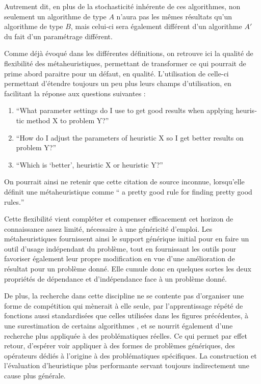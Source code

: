Autrement dit, en plus de la stochasticité inhérente de ces algorithmes, non seulement un algorithme de type $A$ n'aura pas les mêmes résultats qu'un algorithme de type $B$, mais celui-ci sera également différent d'un algorithme $A'$ du fait d'un paramétrage différent.

Comme déjà évoqué dans les différentes définitions, on retrouve ici la qualité de flexibilité des métaheuristiques, permettant de transformer ce qui pourrait de prime abord paraitre pour un défaut, en qualité. L'utilisation de celle-ci permettant d'étendre toujours un peu plus leurs champs d'utilisation, en facilitant la réponse aux questions suivantes  : 
\begin{enumerate}
\item  \foreignquote{english}{What parameter settings do I use to get good results when applying heuristic method X to problem Y?}
\item  \foreignquote{english}{How do I adjust the parameters of heuristic X so I get better results on problem Y?}
\item \foreignquote{english}{Which is \enquote{better}, heuristic X or heuristic Y?}
\end{enumerate}

On pourrait ainsi ne retenir que cette citation de source inconnue, lorsqu'elle définit une métaheuristique comme \foreignquote{english}{ a pretty good rule for finding pretty good rules.}

Cette flexibilité vient compléter et compenser efficacement cet horizon de connaissance assez limité, nécessaire à une généricité d'emploi. Les métaheuristiques fournissent ainsi le support générique initial pour en faire un outil d'usage indépendant du problème, tout en fournissant les outils pour favoriser également leur propre modification en vue d'une amélioration de résultat pour un problème donné. Elle cumule donc en quelques sortes les deux propriétés de dépendance et d'indépendance face à un problème donné. 

De plus, la recherche dans cette discipline ne se contente pas d'organiser une forme de compétition qui mènerait à elle seule, par l'apprentissage répété de fonctions aussi standardisées que celles utilisées dans les figures précédentes, à une surestimation de certains algorithmes , et se nourrit également d'une recherche plus appliquée à des problématiques réelles. Ce qui permet par effet retour, d'espérer voir appliquer à des formes de problèmes génériques, des opérateurs dédiés à l'origine à des problématiques spécifiques. La construction et l'évaluation d'heuristique plus performante servant toujours indirectement une cause plus générale.

